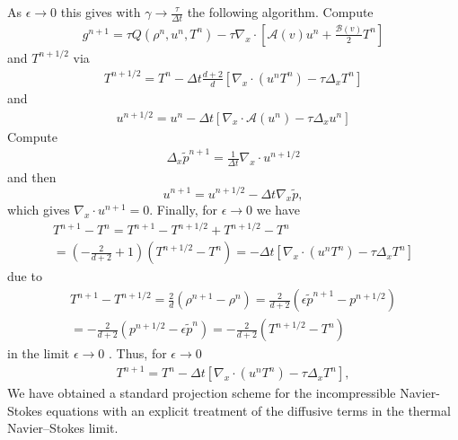 \documentclass[final,11pt]{siamart251216}
\newcommand{\A}{\mathcal{A}}
\numberwithin{equation}{section}
\theoremstyle{definition}
\theoremstyle{remark}
\begin{document}
\begin{remark}
	As $\epsilon \rightarrow 0$ this gives with  $\gamma \rightarrow \frac{\tau}{\Delta t }$ the following algorithm.
	Compute 		
	\begin{eqnarray*}
		g^{n+1}=  \tau Q(\rho^n,u^n,T^n)-\tau \nabla_x \cdot \left[ \mathcal{A}(v) u^n + \frac{\mathcal{B}(v)}{2}T^n \right]
	\end{eqnarray*}
	and
	$T^{n+1/2}$ via 	
	\begin{eqnarray*}
		T^{n+1/2} 
		= T^{n} -  \Delta t \frac{d+2}{d}[\nabla_x \cdot (u^nT^n)-  \tau \Delta_x T^n]
	\end{eqnarray*}
	and
	\begin{eqnarray}
	u^{n+1/2} =  u^n - \Delta t [\nabla_x \cdot \A(u^n ) - \tau \Delta_x u^n]
	\end{eqnarray}
	Compute	  \begin{eqnarray*}
		\Delta_x \tilde p^{n+1}  =  \frac{1 }{ \Delta t } \nabla_x \cdot u^{n+1/2}
	\end{eqnarray*} 
	and then
	$$
	u^{n+1} = u^{n+1/2}- \Delta t \nabla_x \tilde p,
	$$	
	which gives 
	$\nabla_x \cdot u^{n+1} =0$.
	Finally,  for $\epsilon \rightarrow 0$ we have 
	\begin{eqnarray*}
		T^{n+1}-T^n =	T^{n+1}-T^{n+1/2}+T^{n+1/2}-T^n \\= (-\frac{2}{d+2}+1)(T^{n+1/2}-T^n )
		=-  \Delta t[\nabla_x \cdot (u^nT^n)-  \tau \Delta_x T^n]
	\end{eqnarray*}
	due to
	\begin{eqnarray*}
		T^{n+1}-T^{n+1/2}=\frac{2}{d} (\rho^{n+1}- \rho^{n})
		=\frac{2}{d+2}(\epsilon \tilde p^{n+1}- p^{n+1/2})\\
		=-\frac{2}{d+2}( p^{n+1/2}- \epsilon \tilde p^{n})
		= -\frac{2}{d+2}(T^{n+1/2}-T^n )
	\end{eqnarray*}
	in the limit $\epsilon \rightarrow 0$ .
	Thus, 	for $\epsilon \rightarrow 0$
	\begin{eqnarray*}
		T^{n+1}= T^n-  \Delta t[\nabla_x \cdot (u^nT^n)-  \tau \Delta_x T^n],
	\end{eqnarray*}
	We have  obtained 	a standard projection scheme for the incompressible Navier-Stokes equations with an explicit treatment of the diffusive terms in the thermal Navier--Stokes limit.
	

\end{remark}
\end{document}
